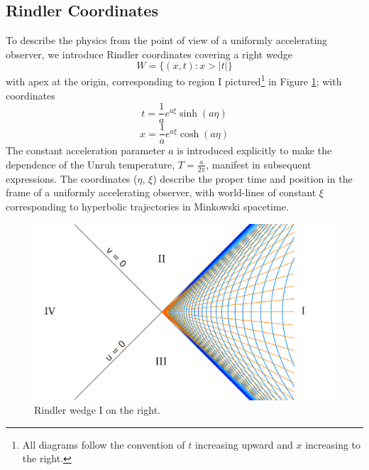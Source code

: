 \documentclass[12pt,a4paper]{article}
\begin{document}
\subsection{Rindler Coordinates}

To describe the physics from the point of view of a uniformly accelerating observer, we introduce Rindler coordinates covering a right wedge 
\begin{equation}
  W = \{(x,t) : x>|t|\}
\end{equation}
with apex at the origin, corresponding to region I pictured\footnote{All diagrams follow the convention of $t$ increasing upward and $x$ increasing to the right.} in Figure \ref{rindlerw}; with coordinates
\begin{equation}
  t = \frac{1}{a}e^{a\xi}\sinh{(a\eta)}
\label{sinh}
\end{equation}
\begin{equation}
x = \frac{1}{a}e^{a\xi}\cosh{(a\eta)}
\end{equation}
The constant acceleration parameter $a$ is introduced explicitly to make the dependence of the Unruh temperature, $T = \frac{a}{2\pi}$, manifest in subsequent expressions. The coordinates ($\eta$, $\xi$) describe the proper time and position in the frame of a uniformly accelerating observer, with world-lines of constant $\xi$ corresponding to hyperbolic trajectories in Minkowski spacetime.

\begin{figure}[h]
\centering
\includegraphics[scale=0.2]{rindler_w.png}
\caption{Rindler wedge I on the right.}
\label{rindlerw}
\end{figure}
\end{document}
